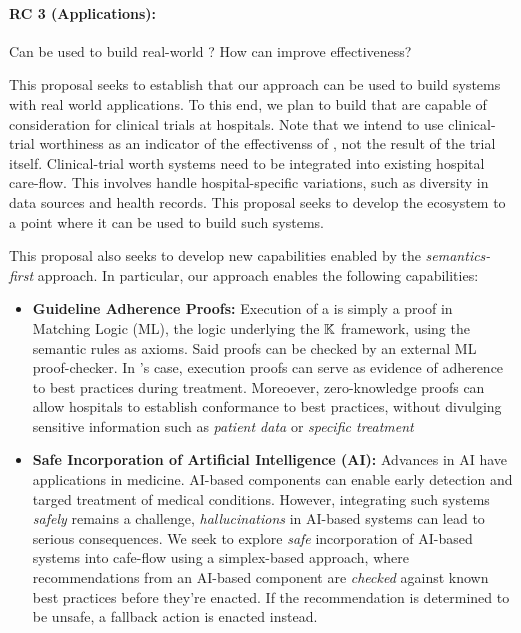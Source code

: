 \paragraph{RC 3 (Applications):} Can \MediK{} be used to build real-world
\CDSS{}? How can \MediK{} improve \CDSSs{} effectiveness?

This proposal
seeks to establish that our approach can be used to build systems with real
world applications. To this end, we plan to build \CDSSs{} that are
capable of consideration for clinical trials at hospitals. Note that we
intend to use clinical-trial worthiness as an indicator of the effectivenss
of \MediK{}, not the result of the trial itself.
Clinical-trial worth systems need to be integrated into existing hospital care-flow.
This involves handle hospital-specific variations, such as
diversity in data sources and health records. This proposal seeks to
develop the \MediK{} ecosystem to a point where it can be used to build
such systems.

This proposal also seeks to develop new \CDSS{} capabilities enabled by the
\emph{semantics-first} approach. In particular, our approach
enables the following capabilities:

\begin{itemize}
  \item \textbf{Guideline Adherence Proofs:} Execution of a
\MediK{} \BPG{} is simply a proof in Matching Logic (ML), the logic
underlying the $\mathbb{K}{}$ framework, using the semantic rules as axioms.
Said proofs can be checked by an external ML proof-checker.
In \MediK{}'s case, execution proofs can serve as evidence of adherence to best practices during treatment.
Moreoever, zero-knowledge proofs can allow hospitals to establish
conformance to best practices, without divulging sensitive information
such as \emph{patient data} or \emph{specific treatment}
  \item \textbf{Safe Incorporation of Artificial Intelligence (AI):}
Advances in AI have applications in medicine. AI-based components
can enable early detection and targed treatment of medical conditions.
However, integrating such systems \emph{safely} remains a challenge,
\emph{hallucinations} in AI-based systems can lead to serious consequences.
We seek to explore \emph{safe} incorporation of AI-based systems into cafe-flow using
a simplex-based approach, where recommendations from an AI-based component are
\emph{checked} against known best practices before they're enacted.
If the recommendation is determined to be unsafe, a fallback action is enacted
instead.
\end{itemize}



